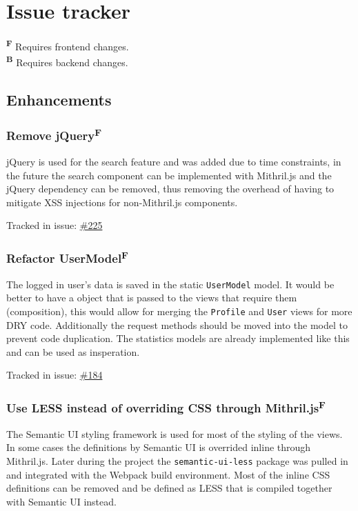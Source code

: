 \documentclass[12pt,a4paper]{report}
\begin{document}
\newpage
\section{Issue tracker}
\label{sec:issue-tracker}
\textbf{\textsuperscript{F}} Requires frontend changes. \\
\textbf{\textsuperscript{B}} Requires backend changes.

\subsection*{Enhancements}
\subsubsection{Remove jQuery\texorpdfstring{\textsuperscript{F}}{}}
\label{subsec:remove-jquery}
jQuery is used for the search feature and was added due to time constraints, in the future the search component can be implemented with Mithril.js and the jQuery dependency can be removed, thus removing the overhead of having to mitigate XSS injections for non-Mithril.js components.

Tracked in issue: \href{https://github.com/LuleaUniversityOfTechnology/2018-project-roaster/issues/225}{\#225}

\subsubsection{Refactor UserModel\texorpdfstring{\textsuperscript{F}}{}}
The logged in user's data is saved in the static \texttt{UserModel} model. It would be better to have a object that is passed to the views that require them (composition), this would allow for merging the \texttt{Profile} and \texttt{User} views for more DRY\cite{dry} code. Additionally the request methods should be moved into the model to prevent code duplication. The statistics models are already implemented like this and can be used as insperation.

Tracked in issue: \href{https://github.com/LuleaUniversityOfTechnology/2018-project-roaster/issues/184}{\#184}

\subsubsection{Use LESS instead of overriding CSS through Mithril.js\texorpdfstring{\textsuperscript{F}}{}}
The Semantic UI styling framework is used for most of the styling of the views. In some cases the definitions by Semantic UI is overrided inline through Mithril.js. Later during the project the \texttt{semantic-ui-less} package was pulled in and integrated with the Webpack build environment. Most of the inline CSS definitions can be removed and be defined as LESS that is compiled together with Semantic UI instead.
\end{document}
